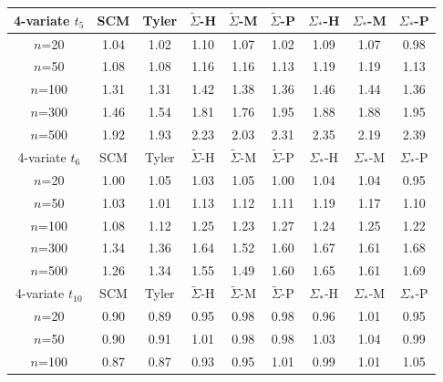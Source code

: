  \begin{table}[t]
 \centering
\begin{scriptsize}
    \begin{tabular}{c|cc|ccc|ccc}
    \hline
    4-variate $t_5$    & SCM  & Tyler & $\tilde{\Sigma}$-H & $\tilde{\Sigma}$-M & $\tilde{\Sigma}$-P & ${\Sigma}_{*}$-H & ${\Sigma}_{*}$-M & ${\Sigma}_{*}$-P \\ \hline
    $n$=20             & 1.04 & 1.02  & 1.10   & 1.07   & 1.02  & 1.09    & 1.07    & 0.98   \\
    $n$=50             & 1.08 & 1.08  & 1.16   & 1.16   & 1.13  & 1.19    & 1.19    & 1.13   \\
    $n$=100            & 1.31 & 1.31  & 1.42   & 1.38   & 1.36  & 1.46    & 1.44    & 1.36   \\
    $n$=300            & 1.46 & 1.54  & 1.81   & 1.76   & 1.95  & 1.88    & 1.88    & 1.95   \\
    $n$=500            & 1.92 & 1.93  & 2.23   & 2.03   & 2.31  & 2.35    & 2.19    & 2.39   \\ \hline
    4-variate $t_6$     & SCM  & Tyler & $\tilde{\Sigma}$-H & $\tilde{\Sigma}$-M & $\tilde{\Sigma}$-P & ${\Sigma}_{*}$-H & ${\Sigma}_{*}$-M & ${\Sigma}_{*}$-P \\ \hline
    $n$=20             & 1.00 & 1.05  & 1.03   & 1.05   & 1.00  & 1.04    & 1.04    & 0.95   \\
    $n$=50             & 1.03 & 1.01  & 1.13   & 1.12   & 1.11  & 1.19    & 1.17    & 1.10   \\
    $n$=100            & 1.08 & 1.12  & 1.25   & 1.23   & 1.27  & 1.24    & 1.25    & 1.22   \\
    $n$=300            & 1.34 & 1.36  & 1.64   & 1.52   & 1.60  & 1.67    & 1.61    & 1.68   \\
    $n$=500            & 1.26 & 1.34  & 1.55   & 1.49   & 1.60  & 1.65    & 1.61    & 1.69   \\ \hline
    4-variate $t_{10}$ & SCM  & Tyler & $\tilde{\Sigma}$-H & $\tilde{\Sigma}$-M & $\tilde{\Sigma}$-P & ${\Sigma}_{*}$-H & ${\Sigma}_{*}$-M & ${\Sigma}_{*}$-P \\ \hline
    $n$=20             & 0.90 & 0.89  & 0.95   & 0.98   & 0.98  & 0.96    & 1.01    & 0.95   \\
    $n$=50             & 0.90 & 0.91  & 1.01   & 0.98   & 0.98  & 1.03    & 1.04    & 0.99   \\
    $n$=100            & 0.87 & 0.87  & 0.93   & 0.95   & 1.01  & 0.99    & 1.01    & 1.05   \\

\end{tabular}
\end{scriptsize}
\end{table}
